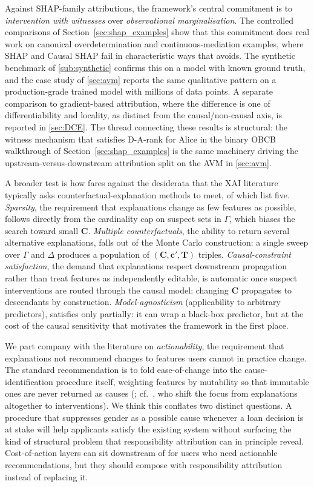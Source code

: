Against SHAP-family attributions, the framework's central commitment is to
\emph{intervention with witnesses} over \emph{observational marginalisation}. The
controlled comparisons of Section~\ref{sec:shap_examples} show that this commitment does
real work on canonical overdetermination and continuous-mediation examples, where SHAP
and Causal SHAP fail in characteristic ways that \ourapproach avoids. The synthetic
benchmark of \cref{sub:synthetic} confirms this on a model with known ground
truth, and the case study of \cref{sec:avm} reports the same qualitative pattern
on a production-grade trained model with millions of data points. A separate comparison
to gradient-based attribution, where the difference is one of differentiability and locality,
as distinct from the causal/non-causal axis, is reported in \cref{sec:DCE}. The
thread connecting these results is structural: the witness mechanism that satisfies
D-A-rank for Alice in the binary OBCB walkthrough of
Section~\ref{sec:shap_examples} is the same machinery driving the upstream-versus-downstream
attribution split on the AVM in \cref{sec:avm}.

A broader test is how \ourapproach fares against the desiderata that the XAI
literature typically asks counterfactual-explanation methods to meet, of which
\cite{verma2022recourses} list five. \emph{Sparsity}, the requirement that
explanations change as few features as possible, follows directly from the
cardinality cap on suspect sets in $\Gamma$, which biases the search toward small
$\mathbf{C}$. \emph{Multiple counterfactuals}, the ability to return several
alternative explanations, falls out of the Monte Carlo construction: a single sweep
over $\Gamma$ and $\Delta$ produces a population of
$(\mathbf{C}, \mathbf{c}', \mathbf{T})$ triples.
\emph{Causal-constraint satisfaction}, the demand that explanations respect
downstream propagation rather than treat features as independently editable, is
automatic once suspect interventions are routed through the causal model: changing
$\mathbf{C}$ propagates to descendants by construction. \emph{Model-agnosticism}
(applicability to arbitrary predictors), \ourapproach satisfies only partially: it
can wrap a black-box predictor, but at the cost of the causal sensitivity that
motivates the framework in the first place.

We part company with the literature on \emph{actionability}, the requirement that explanations not recommend changes to features users cannot in practice change. The standard recommendation is to fold ease-of-change into the
cause-identification procedure itself, weighting features by mutability so that
immutable ones are never returned as causes (\cite{verma2022recourses}; cf.\
\cite{Karimi2021}, who shift the focus from explanations altogether to interventions).
We think this conflates two distinct questions. A procedure that suppresses gender as
a possible cause whenever a loan decision is at stake will help applicants satisfy the
existing system without surfacing the kind of structural
problem that responsibility attribution can in principle reveal. Cost-of-action
layers can sit downstream of \ourapproach for users who need actionable
recommendations, but they should compose with responsibility attribution instead of
replacing it.

